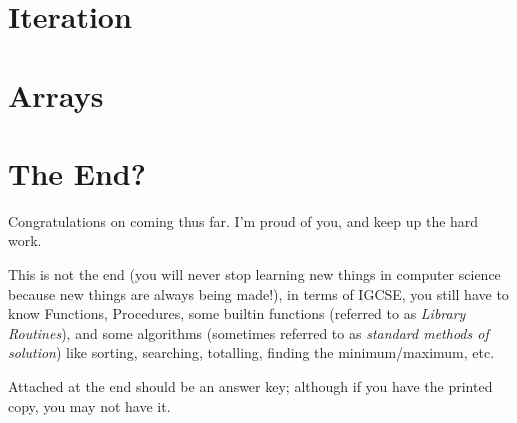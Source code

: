 \documentclass[a4paper, 11pt]{article}
\begin{document}
\newpage 
\section{Iteration}


\newpage
\section{Arrays}


\section{The End?}

Congratulations on coming thus far. I'm proud of you, and keep up the hard work.

This is not the end (you will never stop learning new things in computer science because new things are always being made!), in terms of IGCSE, you still have to know Functions, Procedures, some builtin functions (referred to as \emph{Library Routines}), and some algorithms (sometimes referred to as \emph{standard methods of solution}) like sorting, searching, totalling, finding the minimum/maximum, etc.

Attached at the end should be an answer key; although if you have the printed copy, you may not have it.
\end{document}
